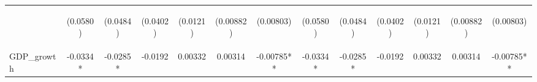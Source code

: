 \documentclass[]{article}
\begin{document}
\begin{center}
\begin{tabular}{lcccccccccccc}
\vspace{4pt} & \begin{footnotesize}(0.0580)\end{footnotesize} & \begin{footnotesize}(0.0484)\end{footnotesize} & \begin{footnotesize}(0.0402)\end{footnotesize} & \begin{footnotesize}(0.0121)\end{footnotesize} & \begin{footnotesize}(0.00882)\end{footnotesize} & \begin{footnotesize}(0.00803)\end{footnotesize} & \begin{footnotesize}(0.0580)\end{footnotesize} & \begin{footnotesize}(0.0484)\end{footnotesize} & \begin{footnotesize}(0.0402)\end{footnotesize} & \begin{footnotesize}(0.0121)\end{footnotesize} & \begin{footnotesize}(0.00882)\end{footnotesize} & \begin{footnotesize}(0.00803)\end{footnotesize} \\
GDP\_growth & -0.0334* & -0.0285* & -0.0192 & 0.00332 & 0.00314 & -0.00785** & -0.0334* & -0.0285* & -0.0192 & 0.00332 & 0.00314 & -0.00785** \\

\end{tabular}
\end{center}
\end{document}
